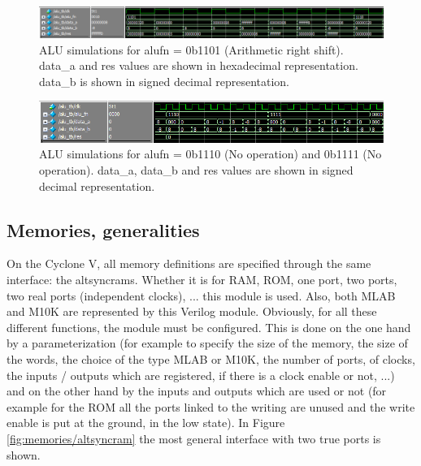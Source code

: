 \begin{figure}[H]
    \centering
    \includegraphics[width=\linewidth]{Chapter3-CPU/res/alu_simu_3_2.PNG}
    \caption{ALU simulations for alufn = 0b1101 (Arithmetic right shift). data\_a and
    res values are shown in hexadecimal representation. data\_b is shown in signed decimal 
    representation.}
    \label{fig:sim/alu_6}
\end{figure}

\begin{figure}[H]
    \centering
    \includegraphics[width=\linewidth]{Chapter3-CPU/res/alu_simu_4.PNG}
    \caption{ALU simulations for alufn = 0b1110 (No operation) and 0b1111 (No operation).
     data\_a, data\_b and res values are shown in signed decimal 
    representation.}
    \label{fig:sim/alu_7}
\end{figure}

\subsection{Memories, generalities}

On the Cyclone V, all memory definitions are specified through the same interface: the altsyncrams. 
Whether it is for RAM, ROM, one port, two ports, two real ports (independent clocks), ... this 
module is used. Also, both MLAB and M10K are represented by this Verilog module. 
Obviously, for all these different functions, the module must be configured. This is done on 
the one hand by a parameterization (for example to specify the size of the memory, the size of the 
words, the choice of the type MLAB or M10K, the number of ports, of clocks, the inputs / outputs 
which are registered, if there is a clock enable or not, ...) and on the other hand by the inputs 
and outputs which are used or not (for example for the ROM all the ports linked to the writing are unused and the write enable is put at the ground, in the low state). 
In Figure \ref{fig:memories/altsyncram} the most general interface 
with two true ports is shown.

